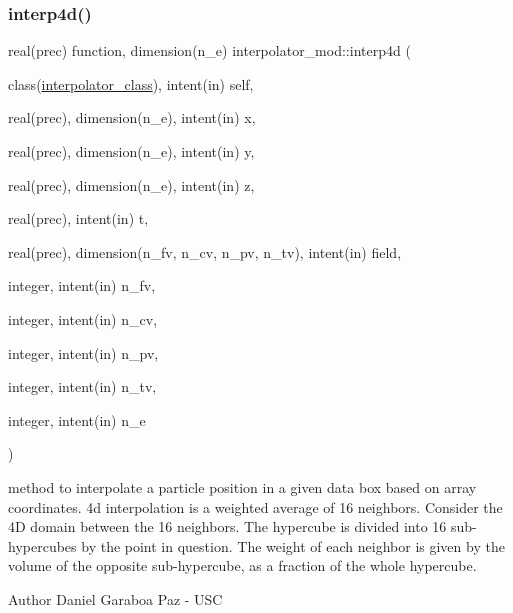 \subsubsection{\texorpdfstring{interp4d()}{interp4d()}}
{\footnotesize\ttfamily real(prec) function, dimension(n\+\_\+e) interpolator\+\_\+mod\+::interp4d (\begin{DoxyParamCaption}\item[{class(\mbox{\hyperlink{structinterpolator__mod_1_1interpolator__class}{interpolator\+\_\+class}}), intent(in)}]{self,  }\item[{real(prec), dimension(n\+\_\+e), intent(in)}]{x,  }\item[{real(prec), dimension(n\+\_\+e), intent(in)}]{y,  }\item[{real(prec), dimension(n\+\_\+e), intent(in)}]{z,  }\item[{real(prec), intent(in)}]{t,  }\item[{real(prec), dimension(n\+\_\+fv, n\+\_\+cv, n\+\_\+pv, n\+\_\+tv), intent(in)}]{field,  }\item[{integer, intent(in)}]{n\+\_\+fv,  }\item[{integer, intent(in)}]{n\+\_\+cv,  }\item[{integer, intent(in)}]{n\+\_\+pv,  }\item[{integer, intent(in)}]{n\+\_\+tv,  }\item[{integer, intent(in)}]{n\+\_\+e }\end{DoxyParamCaption})\hspace{0.3cm}{\ttfamily [private]}}



method to interpolate a particle position in a given data box based on array coordinates. 4d interpolation is a weighted average of 16 neighbors. Consider the 4D domain between the 16 neighbors. The hypercube is divided into 16 sub-\/hypercubes by the point in question. The weight of each neighbor is given by the volume of the opposite sub-\/hypercube, as a fraction of the whole hypercube. 

\begin{DoxyAuthor}{Author}
Daniel Garaboa Paz -\/ U\+SC 
\end{DoxyAuthor}

